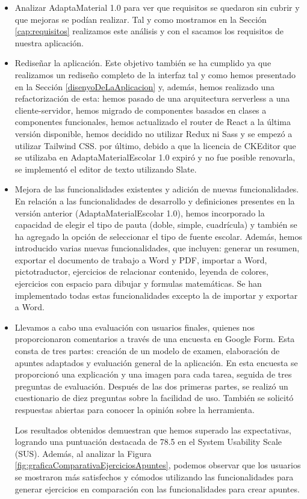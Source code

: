 \begin{itemize}
    \item Analizar AdaptaMaterial 1.0 para ver que requisitos se quedaron sin cubrir y que mejoras se podían realizar. Tal y como mostramos en la Sección \ref{cap:requisitos} realizamos este análisis y con el sacamos los requisitos de nuestra aplicación.
    \item Rediseñar la aplicación. Este objetivo también se ha cumplido ya que realizamos un rediseño completo de la interfaz tal y como hemos presentado en la Sección \ref{disenyoDeLaAplicacion} y, además, hemos realizado una refactorización de esta: hemos pasado de una arquitectura serverless a una cliente-servidor, hemos migrado de componentes basados en clases a componentes funcionales, hemos actualizado el router de React a la última versión disponible, hemos decidido no utilizar Redux ni Sass y se empezó a utilizar Tailwind CSS. por último, debido a que la licencia de CKEditor que se utilizaba en AdaptaMaterialEscolar 1.0 expiró y no fue posible renovarla, se implementó el editor de texto utilizando Slate.
    \item Mejora de las funcionalidades existentes y adición de nuevas funcionalidades. En relación a las funcionalidades de desarrollo y definiciones presentes en la versión anterior (AdaptaMaterialEscolar 1.0), hemos incorporado la capacidad de elegir el tipo de pauta (doble, simple, cuadrícula) y también se ha agregado la opción de seleccionar el tipo de fuente escolar. Además, hemos introducido varias nuevas funcionalidades, que incluyen: generar un resumen, exportar el documento de trabajo a Word y PDF, importar a Word, pictotraductor, ejercicios de relacionar contenido, leyenda de colores, ejercicios con espacio para dibujar y formulas matemáticas. Se han implementado todas estas funcionalidades excepto la de importar y exportar a Word.
    \item Llevamos a cabo una evaluación con usuarios finales, quienes nos proporcionaron comentarios a través de una encuesta en Google Form. Esta consta de tres partes: creación de un modelo de examen, elaboración de apuntes adaptados y evaluación general de la aplicación. En esta encuesta se proporcionó una explicación y una imagen para cada tarea, seguida de tres preguntas de evaluación. Después de las dos primeras partes, se realizó un cuestionario de diez preguntas sobre la facilidad de uso. También se solicitó respuestas abiertas para conocer la opinión sobre la herramienta.
    
    Los resultados obtenidos demuestran que hemos superado las expectativas, logrando una puntuación destacada de 78.5 en el System Usability Scale (SUS). Además, al analizar la Figura \ref{fig:graficaComparativaEjerciciosApuntes}, podemos observar que los usuarios se mostraron más satisfechos y cómodos utilizando las funcionalidades para generar ejercicios en comparación con las funcionalidades para crear apuntes.
\end{itemize}

